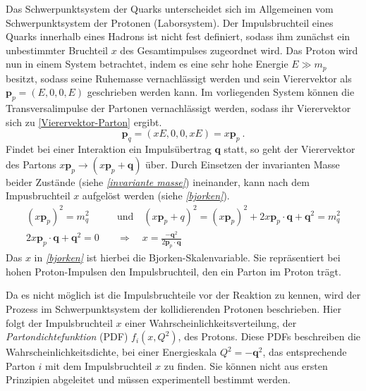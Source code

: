 Das Schwerpunktsystem der Quarks unterscheidet sich im Allgemeinen vom Schwerpunktsystem der Protonen (Laborsystem). Der Impulsbruchteil eines Quarks innerhalb eines Hadrons ist nicht fest definiert, sodass ihm zunächst ein unbestimmter Bruchteil $x$ des Gesamtimpulses zugeordnet wird. Das Proton wird nun in einem System betrachtet, indem es eine sehr hohe Energie  $E \gg m_p$ besitzt, sodass seine Ruhemasse vernachlässigt werden und sein Vierervektor als $\textbf{p}_p = (E, 0, 0, E)$ geschrieben werden kann. Im vorliegenden System können die Transversalimpulse der Partonen vernachlässigt werden, sodass ihr Vierervektor sich zu \textsf{\autoref{Vierervektor-Parton}} ergibt.
\begin{equation}
\label{Vierervektor-Parton}
\textbf{p}_q = (x E, 0, 0, x E) = x \textbf{p}_p ~.
\end{equation}
Findet bei einer Interaktion ein Impulsübertrag $\textbf{q}$ statt, so geht der Vierervektor des Partons $x \textbf{p}_p \rightarrow (x \textbf{p}_p + \textbf{q})$ über. Durch Einsetzen der invarianten Masse beider Zustände (siehe \textit{\autoref{invariante masse}}) ineinander, kann nach dem Impusbruchteil $x$ aufgelöst werden (siehe \textit{\autoref{bjorken}}).
\begin{align}
\left(x \textbf{p}_p\right)^2 = m_q^2 \quad &\text{und} \quad \left(x \textbf{p}_p + q\right)^2 = \left(x \textbf{p}_p\right)^2 + 2x \textbf{p}_p \cdot \textbf{q} + \textbf{q}^2 = m_q^2
\label{invariante masse} \\
2x \textbf{p}_p \cdot \textbf{q} + \textbf{q}^2 = 0 \quad &\Rightarrow \quad x = \frac{-\textbf{q}^2}{2\textbf{p}_p\cdot \textbf{q}}
\label{bjorken}
\end{align}
Das $x$ in \textit{\autoref{bjorken}} ist hierbei die Bjorken-Skalenvariable. Sie repräsentiert bei hohen Proton-Impulsen den Impulsbruchteil, den ein Parton im Proton trägt. 

Da es nicht möglich ist die Impulsbruchteile vor der Reaktion zu kennen, wird der Prozess im Schwerpunktsystem der kollidierenden Protonen beschrieben. Hier folgt der Impulsbruchteil $x$ einer Wahrscheinlichkeitsverteilung, der \textit{Partondichtefunktion} (PDF) $f_{i}(x, Q^2)$, des Protons. Diese PDFs beschreiben die Wahrscheinlichkeitsdichte, bei einer Energieskala $Q^2 = -\textbf{q}^2$, das entsprechende Parton $i$ mit dem Impulsbruchteil $x$ zu finden. Sie können nicht aus ersten Prinzipien abgeleitet und müssen experimentell bestimmt werden. 

